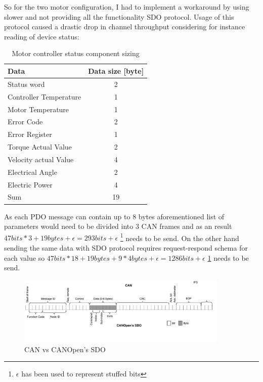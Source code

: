 So for the two motor configuration, I had to implement a workaround by using slower and not providing all the functionality SDO protocol.
Usage of this protocol caused a drastic drop in channel throughput considering for instance reading of device status:
\begin{table}[H]
\centering
\begin{tabular}{|l|c|}
    \hline
    Data & Data size [byte] \\
    \hline
    Status word & 2 \\
    Controller Temperature & 1 \\
    Motor Temperature & 1 \\
    Error Code & 2  \\
    Error Register & 1 \\
    Torque Actual Value & 2  \\
    Velocity actual Value & 4  \\
    Electrical Angle & 2  \\
    Electric Power & 4 \\
    \hline
    \hfill Sum & 19 \\
    \hline
\end{tabular}
\caption{Motor controller status component sizing}
\end{table}

As each PDO message can contain up to 8 bytes aforementioned list of parameters would need to be divided into 3 CAN frames and as an result $47bits*3+19bytes+\epsilon = 293 bits +\epsilon$  \hspace{0.2cm}\footnote{\label{foot:eps}$\epsilon$ has been used to represent stuffed bits} needs to be send. On the other hand sending the same data with SDO protocol requires request-respond schema for each value so $47bits*18 + 19bytes + 9*4bytes + \epsilon = 1286 bits + \epsilon$ \hspace{0.2cm} \ref{foot:eps} needs to be send.

\begin{figure}[H]
    \centering
    \includegraphics[width=0.9\textwidth]{figures/CANOpen_vs_CAN}
    \caption{CAN vs CANOpen's SDO}
    \label{fig:canopen_bitwise}
\end{figure}


